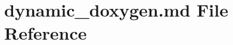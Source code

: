 \hypertarget{dynamic__doxygen_8md}{\section{dynamic\-\_\-doxygen.\-md File Reference}
\label{dynamic__doxygen_8md}
}
